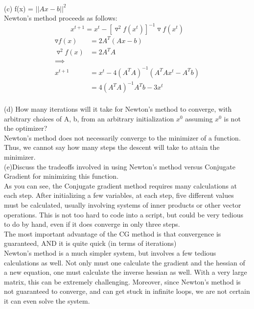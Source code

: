 \documentclass[12pt,letterpaper]{article}
\begin{document}
\vspace{10pt}
\\
(c) f(x) = $||Ax-b||^2$
\vspace{10pt}\\
Newton's method proceeds as follows:
\[x^{t+1} = x^{t} - [\triangledown^2f(x^t)]^{-1}\triangledown f(x^t) \]
\begin{equation*}
    \begin{split}
        \triangledown f(x) &= 2A^T(Ax-b)
        \\
        \triangledown^2 f(x) &= 2A^T A
        \\
        \implies
        \\
        x^{t+1} &= x^t - 4(A^T A)^{-1}(A^T Ax^t - A^T b)
        \\
        &= 4(A^T A)^{-1}A^T b - 3 x^t
    \end{split}
\end{equation*}
\vspace{10pt}
\\
(d) How many iterations will it take for Newton’s method to converge, with arbitrary choices of A, b, from an arbitrary initialization $x^0$ assuming $x^0$ is not the optimizer?
\vspace{10pt}\\
Newton's method does not necessarily converge to the minimizer of a function. Thus, we cannot say how many steps the descent will take to attain the minimizer.
\vspace{10pt}
\\
(e)Discuss the tradeoffs involved in using Newton’s method versus Conjugate Gradient for minimizing this function.
\vspace{10pt}\\
As you can see, the Conjugate gradient method requires many calculations at each step. After initializing a few variables, at each step, five different values must be calculated, usually involving systems of inner products or other vector operations. This is not too hard to code into a script, but could be very tedious to do by hand, even if it does converge in only three steps.\\
The most important advantage of the CG method is that convergence is guaranteed, AND it is quite quick (in terms of iterations)
\vspace{10pt}
\\
Newton's method is a much simpler system, but involves a few tedious calculations as well. Not only must one calculate the gradient and the hessian of a new equation, one must calculate the inverse hessian as well. With a very large matrix, this can be extremely challenging. Moreover, since Newton's method is not guaranteed to converge, and can get stuck in infinite loops, we are not certain it can even solve the system.
\end{document}
